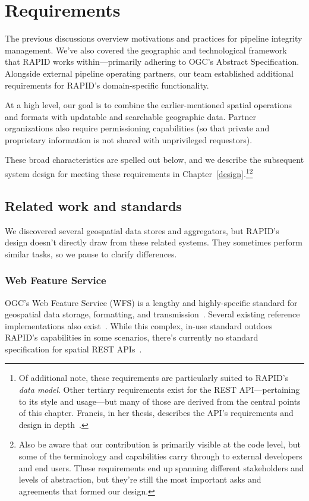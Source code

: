 \chapter{Requirements}
\label{requirements}

The previous discussions overview motivations and practices for pipeline integrity management. We've also covered the geographic and technological framework that RAPID works within---primarily adhering to OGC's Abstract Specification. Alongside external pipeline operating partners, our team established additional requirements for RAPID's domain-specific functionality.

At a high level, our goal is to combine the earlier-mentioned spatial operations and formats with updatable and searchable  geographic data. Partner organizations also require permissioning capabilities (so that private and proprietary information is not shared with unprivileged requestors).

These broad characteristics are spelled out below, and we describe the subsequent system design for meeting these requirements in Chapter~\ref{design}.\footnote{Of additional note, these requirements are particularly suited to RAPID's \textit{data model}. Other tertiary requirements exist for the REST API---pertaining to its style and usage---but many of those are derived from the central points of this chapter. Francis, in her thesis, describes the API's requirements and design in depth~\cite{Francis}.}\footnote{Also be aware that our contribution is primarily visible at the code level, but some of the terminology and capabilities carry through to external developers and end users. These requirements end up spanning different stakeholders and levels of abstraction, but they're still the most important asks and agreements that formed our design.}

\section{Related work and standards}
We discovered several geospatial data stores and aggregators, but RAPID's design doesn't directly draw from these related systems. They sometimes perform similar tasks, so we pause to clarify differences.

\subsection{Web Feature Service}
OGC's Web Feature Service (WFS) is a lengthy and highly-specific standard for geospatial data storage, formatting, and transmission~\cite{WFS}. Several existing reference implementations also exist~\cite{RefImpl}. While this complex, in-use standard outdoes RAPID's capabilities in some scenarios, there's currently no standard specification for spatial REST APIs~\cite{WFS}.


